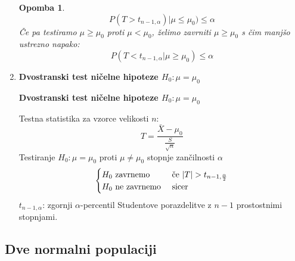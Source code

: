 \documentclass[11pt]{article}
\newtheorem{Opomba}[Izrek]{{\sc Opomba}}
\begin{document}
\begin{enumerate}
\begin{Opomba}
 	$$P(T > t_{n-1,\alpha} )| \mu \le \mu_0) \le \alpha$$
 	Če pa testiramo $\mu \ge \mu_0$ proti $\mu < \mu_0$, želimo zavrniti $\mu \ge \mu_0$ s čim manjšo ustrezno napako:
 	$$P(T< t_{n-1,\alpha} | \mu \ge \mu_0) \le \alpha$$
 \end{Opomba}
	\item
	\textbf{Dvostranski test ničelne hipoteze $H_0: \mu =\mu_0$}
	\begin{framed}
		\begin{center}
			\textbf{Dvostranski test ničelne hipoteze $H_0: \mu =\mu_0$}
		\end{center}
		Testna statistika za vzorce velikosti $n$:
		$$T = \frac{\bar{X} - \mu_0}{\frac{S}{\sqrt{n}}}$$
		Testiranje $H_0: \mu = \mu_0$ proti $\mu \ne \mu_0$ stopnje zančilnosti $\alpha$
		\[
		\begin{cases}
		H_0 \textnormal{ zavrnemo } & \textnormal{če } |T| > t_{n-1,\frac{\alpha}{2}}\\
		H_0 \textnormal{ ne zavrnemo } & \textnormal{sicer}
		\end{cases}
		\]
		$t_{n-1,\alpha}$: zgornji $\alpha$-percentil Studentove porazdelitve z $n-1$ prostostnimi stopnjami.
	\end{framed}
	\end{enumerate}
\subsection{Dve normalni populaciji}
\end{document}
